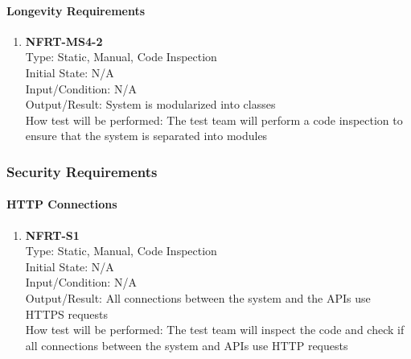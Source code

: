 \documentclass[12pt, titlepage]{article}
\begin{document}
\paragraph{Longevity Requirements}
\begin{enumerate}

\item{\textbf{NFRT-MS4-2}}\\
Type: Static, Manual, Code Inspection\\
Initial State: N/A\\
Input/Condition: N/A\\
Output/Result: System is modularized into classes\\
How test will be performed: The test team will perform a code inspection to ensure that the system is separated into modules
\end{enumerate}

\subsubsection{Security Requirements}
\paragraph{HTTP Connections}
\begin{enumerate}

\item{\textbf{NFRT-S1}}\\
Type: Static, Manual, Code Inspection\\
Initial State: N/A\\
Input/Condition: N/A\\
Output/Result: All connections between the system and the APIs use HTTPS requests\\
How test will be performed: The test team will inspect the code and check if all connections between the system and APIs use HTTP requests
\end{enumerate}
\end{document}
